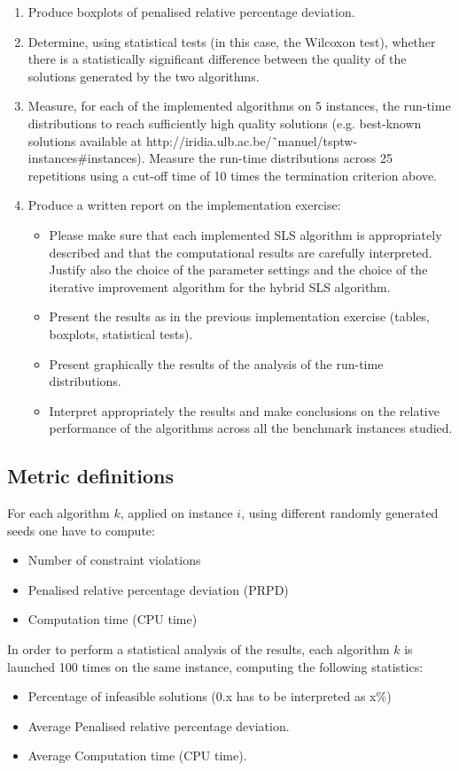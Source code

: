 \begin{homeworkProblem}
\begin{enumerate}
\item Produce boxplots of penalised relative percentage deviation.
\item Determine, using statistical tests (in this case, the Wilcoxon test), whether there is a statistically significant difference between the quality of the solutions generated by the two algorithms.
\item Measure, for each of the implemented algorithms on 5 instances, the run-time distributions to reach sufficiently high quality solutions (e.g. best-known solutions available at http://iridia.ulb.ac.be/˜manuel/tsptw-instances\#instances).
Measure the run-time distributions across 25 repetitions using a cut-off time of 10 times the termination criterion above.
\item Produce a written report on the implementation exercise:
\begin{itemize}
  \item Please make sure that each implemented SLS algorithm is appropriately described and that the computational results are carefully interpreted. Justify also the choice of the parameter settings and the choice
of the iterative improvement algorithm for the hybrid SLS algorithm.
  \item Present the results as in the previous implementation exercise (tables, boxplots, statistical tests).
  \item Present graphically the results of the analysis of the run-time distributions.
  \item Interpret appropriately the results and make conclusions on the relative performance of the algorithms across all the benchmark instances studied.
\end{itemize}
\end{enumerate}

\subsection{Metric definitions}\label{subsec:metric}
For each algorithm $k$, applied on instance $i$, using different randomly generated seeds one have to compute:
\begin{itemize}
  \item Number of constraint violations
  \item Penalised relative percentage deviation (PRPD)
  \item Computation time (CPU time)
\end{itemize}

In order to perform a statistical analysis of the results, each algorithm $k$ is launched 100 times on the same instance, computing the
following statistics:
\begin{itemize}
  \item Percentage of infeasible solutions (0.x has to be interpreted as x\%) 
  \item Average Penalised relative percentage deviation.
  \item Average Computation time (CPU time).
\end{itemize}


\end{homeworkProblem}
